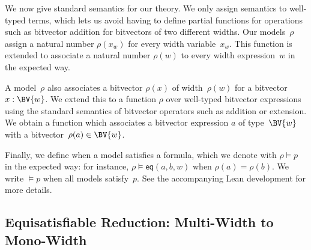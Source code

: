 
We now give standard semantics for our theory.
We only assign semantics to well-typed terms,
which lets us avoid having to define
partial functions for operations such as bitvector addition for bitvectors of
two different widths. Our models~$\rho$ assign a natural number $\rho(x_w)$ for
every width variable~$x_w$. This function is extended to associate a natural
number $\rho(w)$ to every width expression~$w$ in the expected way.

A model~$\rho$ also associates a bitvector $\rho(x)$ of width~$\rho(w)$ for a
bitvector $x : \BV{w}$.
%
We extend this to a function $\rho$ over well-typed bitvector expressions using
the standard semantics of bitvector operators such as addition or extension. We
obtain a function which associates a bitvector expression $a$ of type~$\BV{w}$
with a bitvector~$\rho(a) \in \BV{w}$.

Finally, we define when a model satisfies a formula, which we denote with $\rho
\vDash p$ in the expected way: for instance, $\rho \vDash \mathsf{eq}(a, b, w)$ when
$\rho(a) = \rho(b)$.
%
We write $\vDash p$ when all models satisfy~$p$.
%
See the accompanying Lean development for more
details.

\subsection{Equisatisfiable Reduction: Multi-Width to Mono-Width}
\label{sec:mwbv:reduction}

